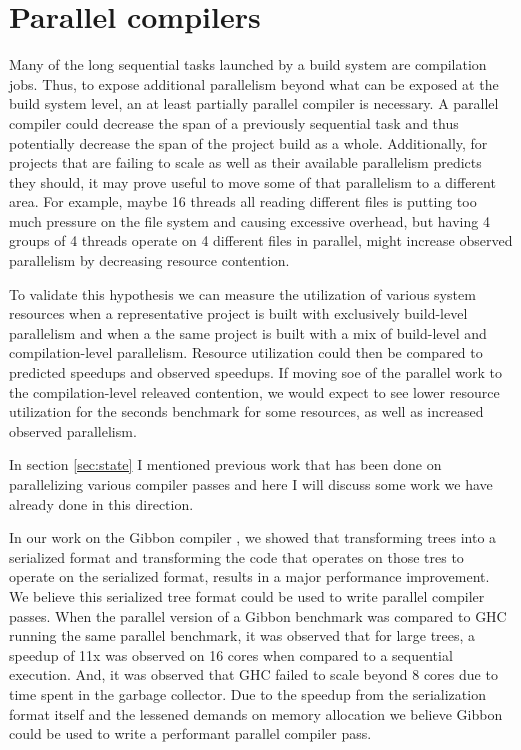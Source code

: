 \documentclass[10pt]{article}
\begin{document}
\section{Parallel compilers}


Many of the long sequential tasks launched by a build system are compilation jobs.  Thus, to
expose additional parallelism beyond what can be exposed at the build system level, an at least
partially parallel compiler is necessary.  A parallel compiler could decrease the span
of a previously sequential task and thus potentially decrease the span of the project build as a
whole.  Additionally, for projects that are failing to scale as well as their available parallelism
predicts they should, it may prove useful to move some of that parallelism to a different area.
For example, maybe 16 threads all reading different files is putting too much pressure on the file
system and causing excessive overhead, but having 4 groups of 4 threads operate on 4 different files
in parallel, might increase observed parallelism by decreasing resource contention.


To validate this hypothesis we can measure the utilization of various system resources when
a representative project is built with exclusively build-level parallelism and when a
the same project is built with a mix of build-level and compilation-level parallelism.  Resource utilization
could then be compared to predicted speedups and observed speedups.  If moving soe of the parallel work
to the compilation-level releaved contention, we would expect to see lower resource utilization for the
seconds benchmark for some resources, as well as increased observed parallelism.


In section \ref{sec:state} I mentioned previous work that has been done on parallelizing various compiler
passes and here I will discuss some work we have already done in this direction. 

In our work on the Gibbon compiler \cite{vollmer2017compiling}, we showed that transforming trees into a serialized
format and transforming the code that operates on those tres to operate on the serialized format,
results in a major performance improvement.  We believe this serialized tree format could be used to
write parallel compiler passes.  When the parallel version of a Gibbon benchmark was compared to
GHC running the same parallel benchmark, it was observed that for large trees, a speedup of
11x was observed on 16 cores when compared to a sequential execution.  And, it was observed that GHC
failed to scale beyond 8 cores due to time spent in the garbage collector.  Due to the speedup from
the serialization format itself and the lessened demands on memory allocation we believe Gibbon
could be used to write a performant parallel compiler pass.
\end{document}
